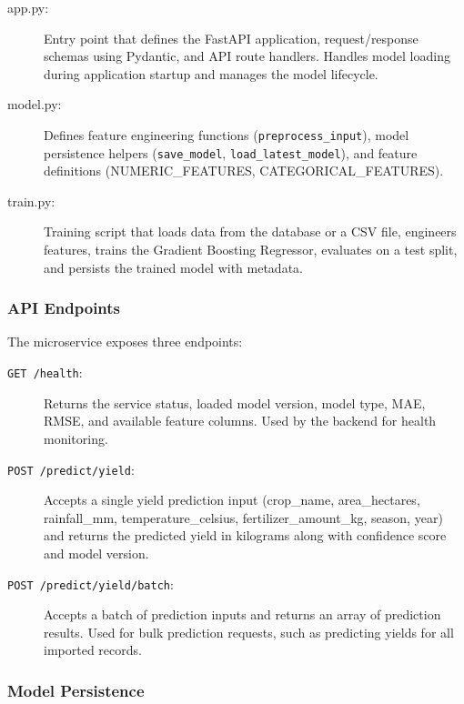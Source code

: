 \begin{description}
  \item[app.py:] Entry point that defines the FastAPI application, request/response schemas using Pydantic, and API route handlers. Handles model loading during application startup and manages the model lifecycle.
  
  \item[model.py:] Defines feature engineering functions (\texttt{preprocess\_input}), model persistence helpers (\texttt{save\_model}, \texttt{load\_latest\_model}), and feature definitions (NUMERIC\_FEATURES, CATEGORICAL\_FEATURES).
  
  \item[train.py:] Training script that loads data from the database or a CSV file, engineers features, trains the Gradient Boosting Regressor, evaluates on a test split, and persists the trained model with metadata.
\end{description}

\subsubsection{API Endpoints}

The microservice exposes three endpoints:

\begin{description}
  \item[\texttt{GET /health}:] Returns the service status, loaded model version, model type, MAE, RMSE, and available feature columns. Used by the backend for health monitoring.
  
  \item[\texttt{POST /predict/yield}:] Accepts a single yield prediction input (crop\_name, area\_hectares, rainfall\_mm, temperature\_celsius, fertilizer\_amount\_kg, season, year) and returns the predicted yield in kilograms along with confidence score and model version.
  
  \item[\texttt{POST /predict/yield/batch}:] Accepts a batch of prediction inputs and returns an array of prediction results. Used for bulk prediction requests, such as predicting yields for all imported records.
\end{description}

\subsubsection{Model Persistence}

